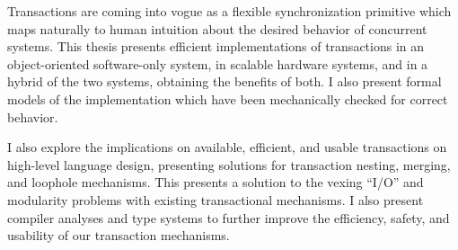 
Transactions are coming into vogue as a flexible synchronization
primitive which maps naturally to human intuition about the desired
behavior of concurrent systems.  This thesis presents efficient
implementations of transactions in an object-oriented
software-only system, in scalable hardware systems, and in a hybrid
of the two systems, obtaining the benefits of both.  I also present
formal models of the implementation which have been mechanically
checked for correct behavior.

I also explore the implications on available, efficient, and usable
transactions on high-level language design, presenting solutions for
transaction nesting, merging, and loophole mechanisms.  This presents
a solution to the vexing ``I/O'' and modularity problems with
existing transactional mechanisms.  I also present compiler analyses
and type systems to further improve the efficiency, safety, and
usability of our transaction mechanisms.

